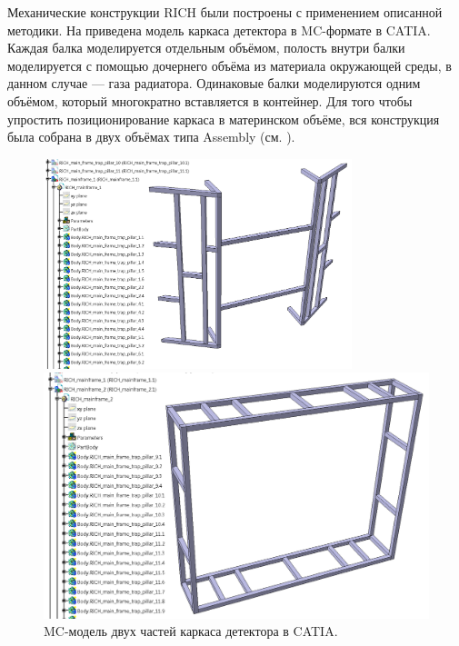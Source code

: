 Механические конструкции RICH были построены с применением описанной методики. На  приведена модель каркаса детектора в MC-формате в CATIA. Каждая балка моделируется отдельным объёмом, полость внутри балки моделируется с помощью дочернего объёма из материала окружающей среды, в данном случае --- газа радиатора. Одинаковые балки моделируются одним объёмом, который многократно вставляется в контейнер. Для того чтобы упростить позиционирование каркаса в материнском объёме, вся конструкция была собрана в двух объёмах типа Assembly (см. ).

\begin{figure}[H]
\begin{minipage}[b]{0.495\textwidth}
\includegraphics[width=0.8\textwidth]{pictures/Mainframe_1.png}
\end{minipage}
\hspace{0.01\textwidth}
\begin{minipage}[b]{0.495\textwidth}
\includegraphics[width=1.0\textwidth]{pictures/Mainframe_2.png}
\end{minipage}
\caption{MC-модель двух частей каркаса детектора в CATIA.}
\label{fig:geoMainframe1and2}
\end{figure}

